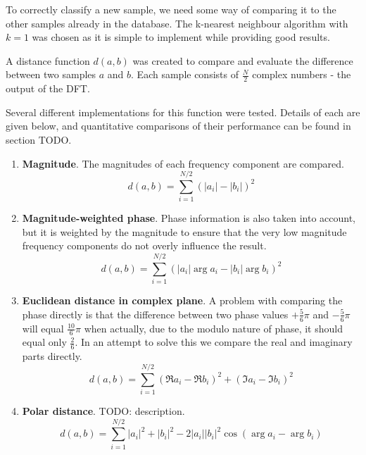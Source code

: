 To correctly classify a new sample, we need some way of comparing it to the other samples already in the database.
The k-nearest neighbour algorithm with $k=1$ was chosen as it is simple to implement while providing good results.

A distance function $d(a,b)$ was created to compare and evaluate the difference between two samples $a$ and $b$.
Each sample consists of $\frac{N}{2}$ complex numbers - the output of the DFT.

Several different implementations for this function were tested.
Details of each are given below, and quantitative comparisons of their performance can be found in section TODO.

\begin{enumerate}
	\item \textbf{Magnitude}.
		The magnitudes of each frequency component are compared.
		\begin{equation}
			d(a, b) = \sum_{i=1}^{N/2} \left( \left|a_i\right| - \left|b_i\right| \right)^2
		\end{equation}
	
	\item \textbf{Magnitude-weighted phase}.
		Phase information is also taken into account, but it is weighted by the magnitude to ensure that
		the very low magnitude frequency components do not overly influence the result.
		\begin{equation}
			d(a, b) = \sum_{i=1}^{N/2} \left( \left|a_i\right| \arg a_i - \left|b_i\right| \arg b_i \right)^2
		\end{equation}

	\item \textbf{Euclidean distance in complex plane}.
		A problem with comparing the phase directly is that the difference between two phase values $+\frac{5}{6}\pi$ and $-\frac{5}{6}\pi$ will
		equal $\frac{10}{6}\pi$ when actually, due to the modulo nature of phase, it should equal only $\frac{2}{6}$.
		In an attempt to solve this we compare the real and imaginary parts directly.
		\begin{equation}
			d(a, b) = \sum_{i=1}^{N/2} \left( \Re{a_i} - \Re{b_i} \right)^2 + \left( \Im{a_i} - \Im{b_i} \right)^2
		\end{equation}
	
	\item \textbf{Polar distance}.
		TODO: description.
		\begin{equation}
			d(a, b) = \sum_{i=1}^{N/2} \left|a_i\right|^2 + \left|b_i\right|^2 - 2 \left|a_i\right| \left|b_i\right|^2 \cos\left(\arg a_i - \arg b_i\right)
		\end{equation}
	

\end{enumerate}
